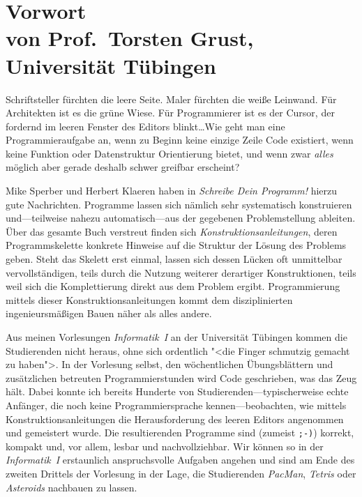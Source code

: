 
\chapter*{Vorwort\\
\normalsize von Prof.\ Torsten Grust, Universität Tübingen}
\thispagestyle{empty}


Schriftsteller fürchten die leere Seite.  Maler fürchten die weiße
Leinwand.  Für Architekten ist es die grüne Wiese.  Für Programmierer
ist es der Cursor, der fordernd im leeren Fenster des Editors
blinkt\dots Wie geht man eine Programmieraufgabe an, wenn zu Beginn
keine einzige Zeile Code existiert, wenn keine Funktion oder
Datenstruktur Orientierung bietet, und wenn zwar \emph{alles} möglich
aber gerade deshalb schwer greifbar erscheint?

Mike Sperber und Herbert Klaeren haben in \textit{Schreibe Dein
Programm!} hierzu gute Nachrichten.  Programme lassen sich nämlich sehr
systematisch konstruieren und---teilweise nahezu auto\-ma\-tisch---aus der
gegebenen Problemstellung ableiten.  Über das gesamte Buch verstreut
finden sich \textit{Konstruktionsanleitungen}, deren Programmskelette
konkrete Hinweise auf die Struktur der Lösung des Problems geben.  Steht
das Skelett erst einmal, lassen sich dessen Lücken oft unmittelbar
vervollständigen, teils durch die Nutzung weiterer derartiger
Konstruktionen, teils weil sich die Komplettierung direkt aus dem
Problem ergibt.  Programmierung mittels dieser Konstruktionsanleitungen
kommt dem disziplinierten ingenieursmäßigen Bauen näher als alles
andere.

Aus meinen Vorlesungen \textit{Informatik~I} an der Universität Tübingen
kommen die Studierenden nicht heraus, ohne sich ordentlich "<die Finger
schmutzig gemacht zu haben">.  In der Vorlesung selbst, den
wöchentlichen Übungsblättern und zusätzlichen betreuten
Programmierstunden wird Code geschrieben, was das Zeug hält.  Dabei
konnte ich bereits Hunderte von Studierenden---typischerweise echte
Anfänger, die noch keine Programmiersprache kennen---beobachten, wie
mittels Konstruktionsanleitungen die Herausforderung des leeren Editors
angenommen und gemeistert wurde.  Die resultierenden Programme sind
(zumeist \texttt{;-)}) korrekt, kompakt und, vor allem, lesbar und
nachvollziehbar.  Wir können so in der \textit{Informatik~I} erstaunlich
anspruchsvolle Aufgaben angehen und sind am Ende des zweiten
Drittels der Vorlesung in der Lage, die Studierenden \textit{PacMan},
\textit{Tetris} oder \textit{Asteroids} nachbauen zu lassen.

